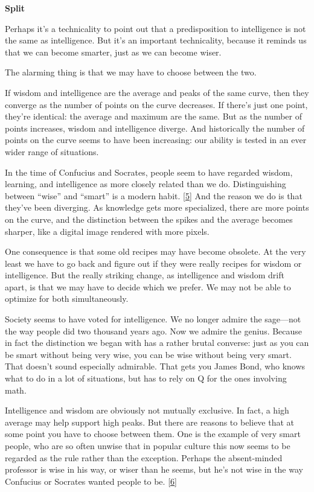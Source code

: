 \textbf{Split}

Perhaps it's a technicality to point out that a predisposition to
intelligence is not the same as intelligence. But it's an important
technicality, because it reminds us that we can become smarter, just as
we can become wiser.

The alarming thing is that we may have to choose between the two.

If wisdom and intelligence are the average and peaks of the same curve,
then they converge as the number of points on the curve decreases. If
there's just one point, they're identical: the average and maximum are
the same. But as the number of points increases, wisdom and intelligence
diverge. And historically the number of points on the curve seems to
have been increasing: our ability is tested in an ever wider range of
situations.

In the time of Confucius and Socrates, people seem to have regarded
wisdom, learning, and intelligence as more closely related than we do.
Distinguishing between ``wise'' and ``smart'' is a modern habit.
{[}\hyperref[f5n]{5}{]} And the reason we do is that they've been
diverging. As knowledge gets more specialized, there are more points on
the curve, and the distinction between the spikes and the average
becomes sharper, like a digital image rendered with more pixels.

One consequence is that some old recipes may have become obsolete. At
the very least we have to go back and figure out if they were really
recipes for wisdom or intelligence. But the really striking change, as
intelligence and wisdom drift apart, is that we may have to decide which
we prefer. We may not be able to optimize for both simultaneously.

Society seems to have voted for intelligence. We no longer admire the
sage---not the way people did two thousand years ago. Now we admire the
genius. Because in fact the distinction we began with has a rather
brutal converse: just as you can be smart without being very wise, you
can be wise without being very smart. That doesn't sound especially
admirable. That gets you James Bond, who knows what to do in a lot of
situations, but has to rely on Q for the ones involving math.

Intelligence and wisdom are obviously not mutually exclusive. In fact, a
high average may help support high peaks. But there are reasons to
believe that at some point you have to choose between them. One is the
example of very smart people, who are so often unwise that in popular
culture this now seems to be regarded as the rule rather than the
exception. Perhaps the absent-minded professor is wise in his way, or
wiser than he seems, but he's not wise in the way Confucius or Socrates
wanted people to be. {[}\hyperref[f6n]{6}{]}

